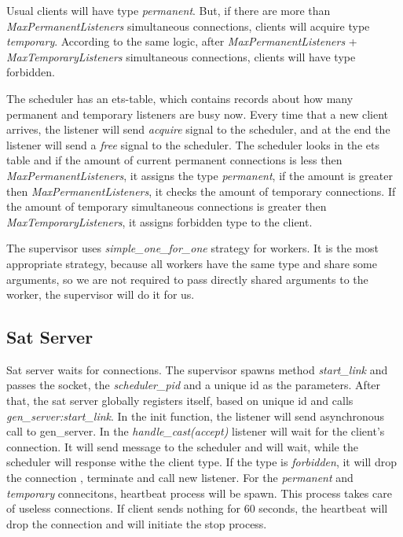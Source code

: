 \documentclass[11pt, a4paper]{scrartcl}
\begin{document}
Usual clients  will have type \emph{permanent}. But, if there are more than \emph{MaxPermanentListeners}
simultaneous connections, clients will acquire type \emph{temporary}. According to the same logic, after 
\emph{MaxPermanentListeners} + \emph{MaxTemporaryListeners} simultaneous connections, clients  will have type
forbidden.

The scheduler has an ets-table, which contains records about how many permanent and temporary listeners are busy
now. Every time that a new client arrives, the listener will send \emph{acquire} signal to the scheduler, and at the end
the listener will send a \emph{free} signal to the scheduler. The scheduler looks in the ets table and if the amount of 
current permanent connections is less then \emph{MaxPermanentListeners}, it assigns the type \emph{permanent},
if the amount is greater then \emph{MaxPermanentListeners}, it checks the amount of temporary connections. 
If the amount of temporary simultaneous connections is greater then \emph{MaxTemporaryListeners}, it assigns 
forbidden type to the client. 

The supervisor uses \emph{simple\_one\_for\_one} strategy for workers. It is the most appropriate strategy, because all workers have the same type and share some arguments, so we are not required to pass directly shared arguments to the worker, the supervisor will do it for us.

\subsection{Sat Server}

Sat server waits for connections. The supervisor spawns method \emph{start\_link} and passes the socket, the \emph{scheduler\_pid} and a unique id as the parameters. After that, the sat server globally registers itself, based on
unique id and calls \emph{gen\_server:start\_link}. In the init function, the listener will send asynchronous call to gen\_server. In the \emph{handle\_cast(accept)} listener will wait for the client's connection. It will 
send message to the scheduler and will wait, while the scheduler will response withe the client type. If the type is \emph{forbidden}, it will drop the connection , terminate and call new listener. For the \emph{permanent} and \emph{temporary} connecitons, 
heartbeat process will be spawn. This process takes care of useless connections. If client sends nothing for 60 seconds, the heartbeat will drop the connection and will initiate the stop process.
\end{document}
